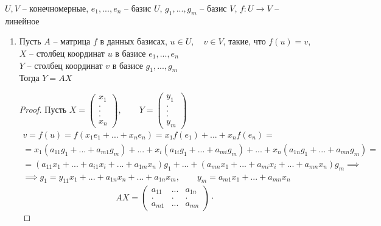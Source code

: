 \begin{lemma}
	$ U, V $ -- конечномерные, $ e_1, ..., e_n $ -- базис $ U $, $ g_1, ..., g_m $ -- базис $ V $, $ f : U \to V $ -- линейное
    \begin{enumerate}
    	\item Пусть $ A $ -- матрица $ f $ в данных базисах, $ u \in U, \quad v \in V $, такие, что $ f(u) = v $, \\
        $ X $ -- столбец координат $ u $ в базисе $ e_1, ..., e_n $ \\
        $ Y $ -- столбец координат $ v $ в базисе $ g_1, ..., g_m $ \\
        Тогда $ Y = AX $
        \begin{proof}
        	Пусть $ X =
            \begin{pmatrix}
            	x_1 \\
                . \\
                . \\
                . \\
                x_n
            \end{pmatrix}, \qquad Y =
            \begin{pmatrix}
            	y_1 \\
                . \\
                . \\
                . \\
                y_m
            \end{pmatrix} $
            \begin{multline*}
                v = f(u) = f(x_1e_1 + ... + x_ne_n) = x_1f(e_1) + ... + x_nf(e_n) = \\ = x_1(a_{11}g_1 + ... + a_{m1}g_m) + ... + x_i(a_{1i}g_1 + ... + a_{mi}g_m) + ... + x_n(a_{1n}g_1 + ... + a_{mn}g_m) = \\ = (a_{11}x_1 + ... + a_{i1}x_i + ... + a_{1m}x_n)g_1 + ... + (a_{mn}x_1 + ... + a_{mi}x_i + ... + a_{mn}x_n)g_m \implies \\ \implies g_1 = y_{11}x_1 + ... + a_{1n}x_n + ... + a_{1n}x_m, \qquad y_m = a_{m1}x_1 + ... + a_{mn}x_n
            \end{multline*}
            $$ AX =
            \begin{pmatrix}
                a_{11} & ... & a_{1n} \\
                . & . & . \\
                a_{m1} & ... & a_{mn}
            \end{pmatrix} \cdot
$$
\end{proof}
\end{enumerate}
\end{lemma}
